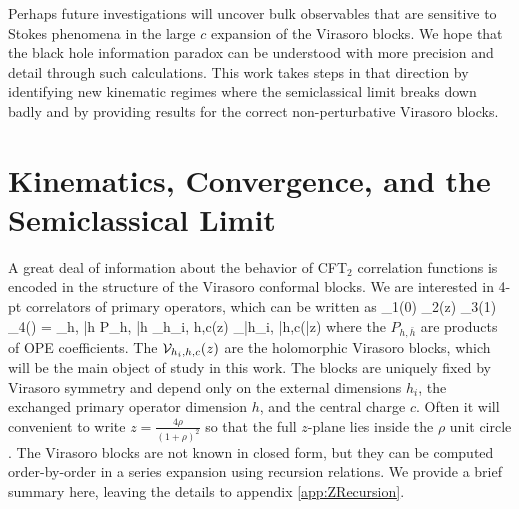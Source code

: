 Perhaps future investigations will uncover bulk observables that are sensitive to Stokes phenomena in the large $c$ expansion of the Virasoro blocks.  We hope that the black hole information paradox can be understood with more precision and detail through such calculations.  This work takes steps in that direction by identifying new kinematic regimes where the semiclassical limit breaks down badly and by providing results for the correct non-perturbative Virasoro blocks.


\section{Kinematics, Convergence, and the Semiclassical Limit}
\label{sec:BlocksZRR}

A great deal of information about the behavior of CFT$_2$ correlation functions is encoded in the structure of the Virasoro conformal blocks.  We are interested in 4-pt correlators of primary operators, which can be written as
\be \label{eq:GenericVirasoroDefinition}
\< \CO_1(0)  \CO_2(z) \CO_3(1) \CO_4(\infty) \> = \sum_{h, \bar h} P_{h, \bar h} \CV_{h_i, h,c}(z) \CV_{\bar h_i, \bar h,c}(\bar z)
\ee
where the $P_{h, \bar h}$ are products of OPE coefficients.  The ${\cal V}_{h_i, h,c}(z)$ are the holomorphic Virasoro blocks, which will be the main object of study in this work.    The blocks are uniquely fixed by Virasoro symmetry and depend only on the external dimensions $h_i$, the exchanged primary operator dimension $h$, and the central charge $c$.  Often it will convenient to write $z = \frac{4 \rho}{(1+\rho)^2}$ so that the full $z$-plane lies inside the $\rho$ unit circle \cite{Pappadopulo:2012jk}.  The Virasoro blocks are not known in closed form, but they can be computed order-by-order in a series expansion using  recursion relations.  We provide a brief summary here, leaving the details to appendix \ref{app:ZRecursion}. 

